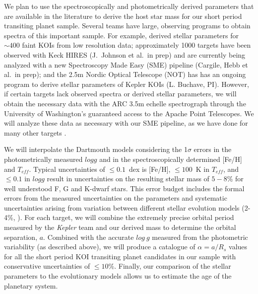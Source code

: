 We plan to use the spectroscopically and photometrically derived
parameters that are available in the literature to derive the host
star mass for our short period transiting planet sample.  Several
teams have large, observing programs to obtain spectra of this
important sample.  For example, \citet{Everett2013} derived stellar
parameters for $\sim 400$ faint KOIs from low resolution data;
approximately 1000 targets have been observed with Keck HIRES
(J.~Johnson et al.\ in prep) and are currently being analyzed with a
new Spectroscopy Made Easy (SME) pipeline (Cargile, Hebb et al.\ in
prep); and the 2.5m Nordic Optical Telescope (NOT) has has an ongoing
program to derive stellar parameters of Kepler KOIs (L. Buchave, PI).
However, if certain targets lack observed spectra or derived stellar
parameters, we will obtain the necessary data with the ARC 3.5m
echelle spectrograph through the University of Washington's guaranteed
access to the Apache Point Telescopes.  We will analyze these data as
necessary with our SME pipeline, as we have done for many other
targets \citep[i.e.][]{Wisniewski2012}.

We will interpolate the Dartmouth models considering the 1$\sigma$
errors in the photometrically measured $log g$ and in the
spectroscopically determined [Fe/H] and $T_{eff}$.  Typical
uncertainties of $\le 0.1$~dex is [Fe/H], $\le 100$~K in $T_{eff}$,
and $\le 0.1$ in $log g$ result in uncertainties on the resulting
stellar mass of $5-8$\% for well understood F, G and K-dwarf stars.
This error budget includes the formal errors from the measured
uncertainties on the parameters and systematic uncertainties arising
from variation between different stellar evolution models
(2-4\%, \citep{Southworth2009}).  For each target, we will combine the
extremely precise orbital period measured by the {\it Kepler} team and
our derived mass to determine the orbital separation, $a$.  Combined
with the accurate $log~g$ measured from the photometric variability
(as described above), we will produce a catalogue of $\alpha =
a/R_{s}$ values for all the short period KOI transiting planet
candidates in our sample with conservative uncertainties of $\le
10$\%.  Finally, our comparison of the stellar parameters to the
evolutionary models allows us to estimate the age of the planetary
system.

